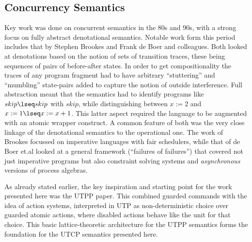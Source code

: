 \subsection{Concurrency Semantics}

Key work was done on concurrent semantics in the 80s and 90s,
with a strong focus on fully abstract denotational
semantics.
Notable work form this period includes that by
Stephen Brookes\cite{DBLP:journals/iandc/Brookes96}
and Frank de Boer and colleagues\cite{DBLP:conf/concur/BoerKPR91}.
Both looked at denotations based on the notion of sets of transition traces,
these being sequences of pairs of before-after states.
In order to get compositionality the traces of any program fragment
had to have arbitrary ``stuttering'' and ``mumbling'' state-pairs
added to capture the notion of outside interference.
Full abstraction meant that the semantics had to identify
programs like $skip\lseq skip$ with $skip$,
while distinguishing between $x:=2$ and $x:=1\lseq x:=x+1$.
This latter aspect required the language to be augmented with
an atomic wrapper construct.
A common feature of both was the very close linkage of the denotational
semantics to the operational one.
The work of Brookes\cite{DBLP:journals/iandc/Brookes96}
focussed on imperative languages with fair schedulers,
while that of de Boer et.al\cite{DBLP:conf/concur/BoerKPR91}
looked at a general framework (``failures of failures'')
that covered not just imperative programs
but also constraint solving systems
and \emph{asynchronous} versions of process algebras.


As already stated earlier,
the key inspiration and starting point for the work presented here
was the UTPP paper\cite{DBLP:conf/icfem/WoodcockH02}.
This combined guarded commands\cite{1976:book:dijkstra}
with the idea of action systems\cite{PODC::BackK1983},
interpreted in UTP as non-deterministic choice
over guarded atomic actions,
where disabled actions behave like the unit for that choice.
This basic lattice-theoretic architecture for the UTPP semantics
forms the foundation for the UTCP semantics presented here.
